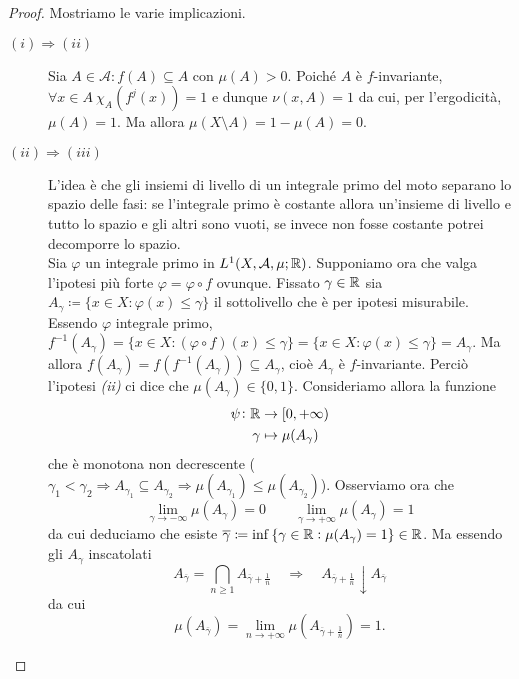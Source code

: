 \begin{proof}
    Mostriamo le varie implicazioni.
    \begin{description}
        \item[$ (i) \Rightarrow (ii) $] Sia $ A\in\mathcal{A} : f(A) \subseteq A $ con $\mu(A) > 0 $. Poiché $ A $ è $ f $-invariante, $ \forall x\in A\ \chi_A(f^j(x)) = 1 $ e dunque $ \nu(x,A) = 1 $ da cui, per l'ergodicità, $ \mu(A) = 1 $. Ma allora $ \mu(X \setminus A) = 1 - \mu(A) = 0 $.
        \item[$ (ii) \Rightarrow (iii) $] L'idea è che gli insiemi di livello di un integrale primo del moto separano lo spazio delle fasi: se l'integrale primo è costante allora un'insieme di livello e tutto lo spazio e gli altri sono vuoti, se invece non fosse costante potrei decomporre lo spazio. \\
        Sia $ \varphi $ un integrale primo in $ L^1(X, \mathcal{A}, \mu; \mathbb{R}) $. Supponiamo ora che valga l'ipotesi più forte $ \varphi = \varphi \circ f $ ovunque. Fissato $ \gamma \in \mathbb{R} $ sia $ A_\gamma \coloneqq \{x \in X : \varphi(x) \leq \gamma\} $ il sottolivello che è per ipotesi misurabile. Essendo $ \varphi $ integrale primo, $ f^{-1}(A_\gamma) = \{x \in X : (\varphi \circ f)(x) \leq \gamma\} = \{x \in X : \varphi(x) \leq \gamma\} = A_\gamma $. Ma allora $ f(A_\gamma) = f(f^{-1}(A_\gamma)) \subseteq A_\gamma $, cioè $ A_\gamma $ è $ f $-invariante. Perciò l'ipotesi \emph{(ii)} ci dice che $ \mu(A_\gamma) \in \{0, 1\} $. Consideriamo allora la funzione
        \begin{align*}
            \psi \colon \mathbb{R} & \to [0, +\infty) \\
            \gamma & \mapsto \mu(A_\gamma)
        \end{align*}
        che è monotona non decrescente ($ \gamma_1 < \gamma_2 \Rightarrow A_{\gamma_1} \subseteq A_{\gamma_2} \Rightarrow \mu(A_{\gamma_1}) \leq \mu(A_{\gamma_2}) $). Osserviamo ora che
        \[
            \lim_{\gamma \to -\infty} \mu(A_\gamma) = 0 \qquad \lim_{\gamma \to +\infty} \mu(A_\gamma) = 1
        \]
        da cui deduciamo che esiste $ \overline{\gamma} \coloneqq \inf{\{\gamma \in \mathbb{R}: \mu(A_\gamma) = 1\}} \in \mathbb{R} $. Ma essendo gli $ A_\gamma $ inscatolati
        \[
            A_{\overline{\gamma}} = \bigcap_{n \geq 1} A_{\overline{\gamma} + \frac{1}{n}} \quad \Rightarrow \quad A_{\overline{\gamma} + \frac{1}{n}} \downarrow A_{\overline{\gamma}}
        \]
        da cui
        \[
            \mu(A_{\overline{\gamma}}) = \lim_{n \to +\infty} \mu\left(A_{\overline{\gamma} + \frac{1}{n}}\right) = 1.
\]
\end{description}
\end{proof}
